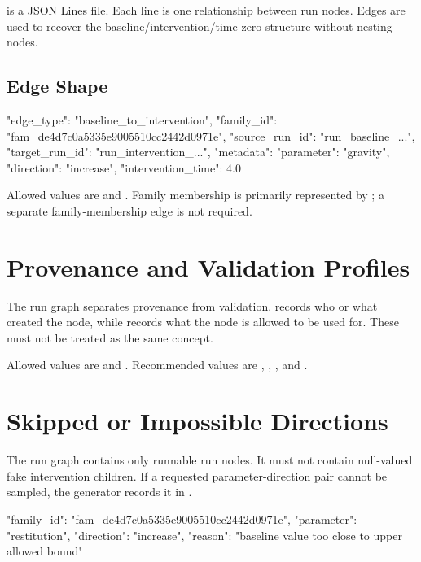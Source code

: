 \documentclass[11pt]{article}
\begin{document}
 is a JSON Lines file.
Each line is one relationship between run nodes.
Edges are used to recover the baseline/intervention/time-zero structure without nesting nodes.

\subsection*{Edge Shape}

\begin{DocCode}
{
  "edge_type": "baseline_to_intervention",
  "family_id": "fam_de4d7c0a5335e9005510cc2442d0971e",
  "source_run_id": "run_baseline_...",
  "target_run_id": "run_intervention_...",
  "metadata": {
    "parameter": "gravity",
    "direction": "increase",
    "intervention_time": 4.0
  }
}
\end{DocCode}

Allowed  values are  and .
Family membership is primarily represented by ; a separate family-membership edge is not required.

\section*{Provenance and Validation Profiles}

The run graph separates provenance from validation.
 records who or what created the node, while  records what the node is allowed to be used for.
These must not be treated as the same concept.

Allowed  values are  and .
Recommended  values are , , , and .

\section*{Skipped or Impossible Directions}

The run graph contains only runnable run nodes.
It must not contain null-valued fake intervention children.
If a requested parameter-direction pair cannot be sampled, the generator records it in .

\begin{DocCode}
{
  "family_id": "fam_de4d7c0a5335e9005510cc2442d0971e",
  "parameter": "restitution",
  "direction": "increase",
  "reason": "baseline value too close to upper allowed bound"
}
\end{DocCode}
\end{document}
